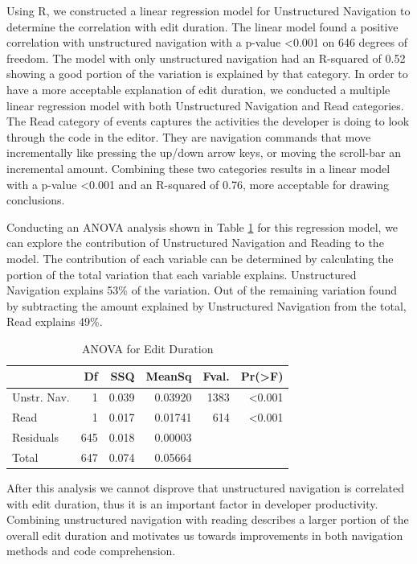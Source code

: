 \documentclass{sig-alternate}
\begin{document}
Using R\cite{Rcitation}, we constructed a linear regression model for Unstructured Navigation to determine the correlation with edit duration.  The linear model found a positive correlation with unstructured navigation with a p-value <0.001 on 646 degrees of freedom.  The model with only unstructured navigation had an R-squared of 0.52 showing a good portion of the variation is explained by that category.  In order to have a more acceptable explanation of edit duration, we conducted a multiple linear regression model with both Unstructured Navigation and Read categories. The Read category of events captures the activities the developer is doing to look through the code in the editor.  They are navigation commands that move incrementally like pressing the up/down arrow keys, or moving the scroll-bar an incremental amount.  Combining these two categories results in a linear model with a p-value <0.001 and an R-squared of 0.76, more acceptable for drawing conclusions.  

Conducting an ANOVA analysis shown in Table \ref{editDurationANOVA} for this regression model, we can explore the contribution of Unstructured Navigation and Reading to the model.  The contribution of each variable can be determined by calculating the portion of the total variation that each variable explains.  Unstructured Navigation explains 53\% of the variation.  Out of the remaining variation found by subtracting the amount explained by Unstructured Navigation from the total, Read explains 49\%.  

\begin{table}[!t]

\begin{mdframed}[linecolor=white]
\begin{tabular}{|l|r|r|r|r|r|}
\hline
                          &  Df  & SSQ & MeanSq &Fval.   & Pr(>F)    \\
\hline
Unstr. Nav.& 1 & 0.039& 0.03920 & 1383 & <0.001\\
\hline
Read                 & 1 & 0.017 & 0.01741 & 614 & <0.001\\
\hline
Residuals                & 645 & 0.018 & 0.00003   &  &  \\
\hline
Total		& 647 & 0.074 & 0.05664 & & \\
\hline
\end{tabular}
\caption{ANOVA for Edit Duration}
\label{editDurationANOVA}
\end{mdframed}\end{table}

After this analysis we cannot disprove that unstructured navigation is correlated with edit duration, thus it is an important factor in developer productivity.  Combining unstructured navigation with reading describes a larger portion of the overall edit duration and motivates us towards improvements in both navigation methods and code comprehension.  
\end{document}
